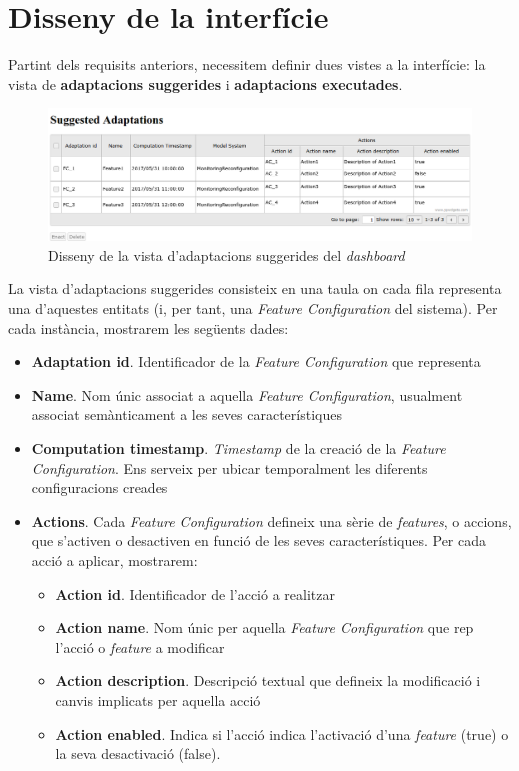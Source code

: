 \section{Disseny de la interfície}

Partint dels requisits anteriors, necessitem definir dues vistes a la interfície: la vista de \textbf{adaptacions suggerides} i \textbf{adaptacions executades}.\\

\begin{figure}
\centering
\includegraphics[width=14cm]{Figures/Figure32}
\decoRule
\caption{Disseny de la vista d'adaptacions suggerides del \textit{dashboard}}
\label{fig:Figura32}
\end{figure}  

La vista d'adaptacions suggerides consisteix en una taula on cada fila representa una d'aquestes entitats (i, per tant, una \textit{Feature Configuration} del sistema). Per cada instància, mostrarem les següents dades:

\begin{itemize}
\item \textbf{Adaptation id}. Identificador de la \textit{Feature Configuration} que representa
\item \textbf{Name}. Nom únic associat a aquella \textit{Feature Configuration}, usualment associat semànticament a les seves característiques 
\item \textbf{Computation timestamp}. \textit{Timestamp} de la creació de la \textit{Feature Configuration}. Ens serveix per ubicar temporalment les diferents configuracions creades
\item \textbf{Actions}. Cada \textit{Feature Configuration} defineix una sèrie de \textit{features}, o accions, que s'activen o desactiven en funció de les seves característiques. Per cada acció a aplicar, mostrarem:
\begin{itemize}
\item \textbf{Action id}. Identificador de l'acció a realitzar
\item \textbf{Action name}. Nom únic per aquella \textit{Feature Configuration} que rep l'acció o \textit{feature} a modificar
\item \textbf{Action description}. Descripció textual que defineix la modificació i canvis implicats per aquella acció
\item \textbf{Action enabled}. Indica si l'acció indica l'activació d'una \textit{feature} (true) o la seva desactivació (false).
\end{itemize}
\end{itemize}

